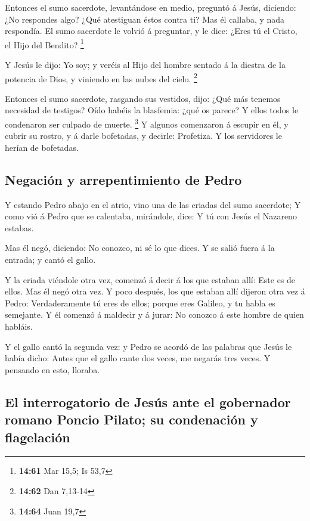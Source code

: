  Entonces el sumo sacerdote, levantándose en medio,
preguntó á Jesús, diciendo: ¿No respondes algo? ¿Qué atestiguan éstos
contra ti?  Mas él callaba, y nada respondía. El sumo
sacerdote le volvió á preguntar, y le dice: ¿Eres tú el Cristo, el Hijo
del Bendito? \footnote{\textbf{14:61} Mar 15,5; Is 53,7}

 Y Jesús le dijo: Yo soy; y veréis al Hijo del hombre
sentado á la diestra de la potencia de Dios, y viniendo en las nubes del
cielo. \footnote{\textbf{14:62} Dan 7,13-14}

 Entonces el sumo sacerdote, rasgando sus vestidos, dijo:
¿Qué más tenemos necesidad de testigos?  Oído habéis la
blasfemia: ¿qué os parece? Y ellos todos le condenaron ser culpado de
muerte. \footnote{\textbf{14:64} Juan 19,7}  Y algunos
comenzaron á escupir en él, y cubrir su rostro, y á darle bofetadas, y
decirle: Profetiza. Y los servidores le herían de bofetadas.

\hypertarget{negaciuxf3n-y-arrepentimiento-de-pedro}{%
\subsection{Negación y arrepentimiento de
Pedro}\label{negaciuxf3n-y-arrepentimiento-de-pedro}}

 Y estando Pedro abajo en el atrio, vino una de las criadas
del sumo sacerdote;  Y como vió á Pedro que se calentaba,
mirándole, dice: Y tú con Jesús el Nazareno estabas.

 Mas él negó, diciendo: No conozco, ni sé lo que dices. Y
se salió fuera á la entrada; y cantó el gallo.

 Y la criada viéndole otra vez, comenzó á decir á los que
estaban allí: Este es de ellos.  Mas él negó otra vez. Y
poco después, los que estaban allí dijeron otra vez á Pedro:
Verdaderamente tú eres de ellos; porque eres Galileo, y tu habla es
semejante.  Y él comenzó á maldecir y á jurar: No conozco á
este hombre de quien habláis.

 Y el gallo cantó la segunda vez: y Pedro se acordó de las
palabras que Jesús le había dicho: Antes que el gallo cante dos veces,
me negarás tres veces. Y pensando en esto, lloraba.

\hypertarget{el-interrogatorio-de-jesuxfas-ante-el-gobernador-romano-poncio-pilato-su-condenaciuxf3n-y-flagelaciuxf3n}{%
\subsection{El interrogatorio de Jesús ante el gobernador romano Poncio
Pilato; su condenación y
flagelación}\label{el-interrogatorio-de-jesuxfas-ante-el-gobernador-romano-poncio-pilato-su-condenaciuxf3n-y-flagelaciuxf3n}}

